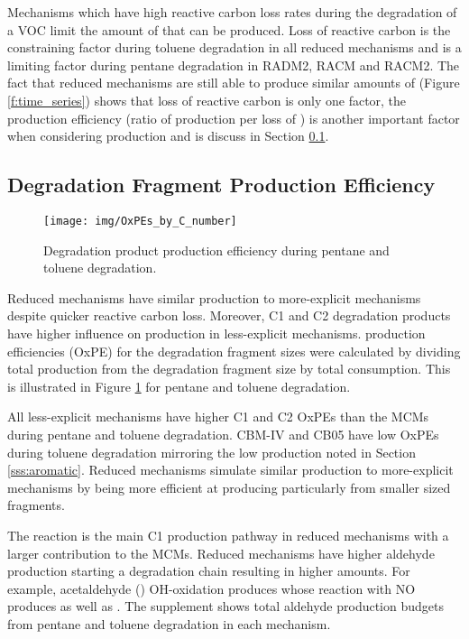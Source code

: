 Mechanisms which have high reactive carbon loss rates during the degradation of a VOC limit the amount of  that can be produced.
Loss of reactive carbon is the constraining factor during toluene degradation in all reduced mechanisms and is a limiting factor during pentane degradation in RADM2, RACM and RACM2.
The fact that reduced mechanisms are still able to produce similar amounts of  (Figure \ref{f:time_series}) shows that loss of reactive carbon is only one factor, the  production efficiency (ratio of  production per loss of ) is another important factor when considering  production and is discuss in Section \ref{ss:OxPE}.

\subsection[Degradation Fragment Ox Production Efficiency]{Degradation Fragment  Production Efficiency} \label{ss:OxPE}

\begin{figure}
    \centering
    \texttt{[image: img/OxPEs\_by\_C\_number]}
    \vspace{0mm}
    \caption{Degradation product  production efficiency during pentane and toluene degradation.}
    \vspace{-4mm}
    \label{f:OxPE}
\end{figure}

Reduced mechanisms have similar  production to more-explicit mechanisms despite quicker reactive carbon loss.
Moreover, C1 and C2 degradation products have higher influence on  production in less-explicit mechanisms.
 production efficiencies (OxPE) for the degradation fragment sizes were calculated by dividing total  production from the degradation fragment size by total  consumption.
This is illustrated in Figure \ref{f:OxPE} for pentane and toluene degradation.

All less-explicit mechanisms have higher C1 and C2 OxPEs than the MCMs during pentane and toluene degradation.
CBM-IV and CB05 have low OxPEs during toluene degradation mirroring the low  production noted in Section \ref{sss:aromatic}.
Reduced mechanisms simulate similar  production to more-explicit mechanisms by being more efficient at producing  particularly from smaller sized fragments.

The  reaction is the main C1  production pathway in reduced mechanisms with a larger contribution to the MCMs.
Reduced mechanisms have higher aldehyde production starting a degradation chain resulting in higher  amounts.
For example, acetaldehyde () OH-oxidation produces  whose reaction with NO produces  as well as .
The supplement shows total aldehyde production budgets from pentane and toluene degradation in each mechanism.  

